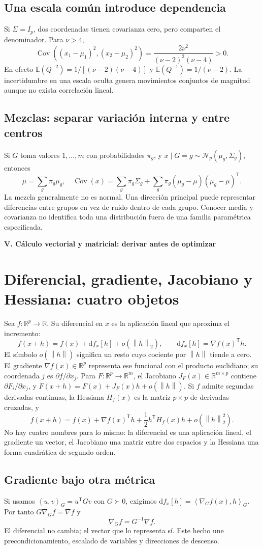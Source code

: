 \documentclass[11pt,a4paper]{article}
\newcommand{\R}{\mathbb R}
\newcommand{\E}{\mathbb E}
\newcommand{\T}{^{\mathsf T}}
\newcommand{\norm}[1]{\left\lVert #1\right\rVert}
\newcommand{\ip}[2]{\left\langle #1,#2\right\rangle}
\DeclareMathOperator{\Cov}{Cov}
\theoremstyle{definition}
\newcommand{\parte}[1]{\par\bigskip\Needspace{8\baselineskip}\begin{center}{\Large\bfseries\color{azul}#1}\end{center}}
\begin{document}
\subsection{Una escala común introduce dependencia}
Si $\Sigma=I_p$, dos coordenadas tienen covarianza cero, pero comparten el denominador. Para $\nu>4$,
\[
\Cov((x_1-\mu_1)^2,(x_2-\mu_2)^2)
=\frac{2\nu^2}{(\nu-2)^2(\nu-4)}>0.
\]
En efecto $\E(Q^{-2})=1/[(\nu-2)(\nu-4)]$ y $\E(Q^{-1})=1/(\nu-2)$. La incertidumbre en una escala oculta genera movimientos conjuntos de magnitud aunque no exista correlación lineal.
\subsection{Mezclas: separar variación interna y entre centros}
Si $G$ toma valores $1,\ldots,m$ con probabilidades $\pi_g$, y $x\mid G=g\sim\mathcal N_p(\mu_g,\Sigma_g)$, entonces
\[
\mu=\sum_g\pi_g\mu_g,\quad
\Cov(x)=\sum_g\pi_g\Sigma_g+
\sum_g\pi_g(\mu_g-\mu)(\mu_g-\mu)\T.
\]
La mezcla generalmente no es normal. Una dirección principal puede representar diferencias entre grupos en vez de ruido dentro de cada grupo. Conocer media y covarianza no identifica toda una distribución fuera de una familia paramétrica especificada.

\parte{V. Cálculo vectorial y matricial: derivar antes de optimizar}
\section{Diferencial, gradiente, Jacobiano y Hessiana: cuatro objetos}
Sea $f:\R^p\to\R$. Su diferencial en $x$ es la aplicación lineal que aproxima el incremento:
\[
f(x+h)=f(x)+\mathrm df_x[h]+o(\norm h_2),\qquad
\mathrm df_x[h]=\nabla f(x)\T h.
\]
El símbolo $o(\norm h)$ significa un resto cuyo cociente por $\norm h$ tiende a cero. El gradiente $\nabla f(x)\in\R^p$ representa ese funcional con el producto euclidiano; su coordenada $j$ es $\partial f/\partial x_j$. Para $F:\R^p\to\R^m$, el Jacobiano $J_F(x)\in\R^{m\times p}$ contiene $\partial F_i/\partial x_j$, y $F(x+h)=F(x)+J_F(x)h+o(\norm h)$.
Si $f$ admite segundas derivadas continuas, la Hessiana $H_f(x)$ es la matriz $p\times p$ de derivadas cruzadas, y
\[
f(x+h)=f(x)+\nabla f(x)\T h+\frac12h\T H_f(x)h+o(\norm h_2^2).
\]
No hay cuatro nombres para lo mismo: la diferencial es una aplicación lineal, el gradiente un vector, el Jacobiano una matriz entre dos espacios y la Hessiana una forma cuadrática de segundo orden.
\subsection{Gradiente bajo otra métrica}
Si usamos $\ip uv_G=u\T Gv$ con $G\succ0$, exigimos $\mathrm df_x[h]=\ip{\nabla_G f(x)}h_G$. Por tanto $G\nabla_G f=\nabla f$ y
\[
\nabla_G f=G^{-1}\nabla f.
\]
El diferencial no cambia; el vector que lo representa sí. Este hecho une precondicionamiento, escalado de variables y direcciones de descenso.
\end{document}
